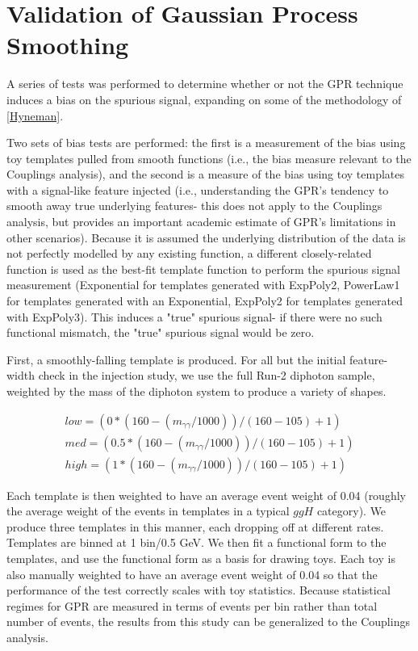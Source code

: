\section{Validation of Gaussian Process Smoothing}
\label{sec:GPR_validation}
A series of tests was performed to determine whether or not the GPR technique induces a bias on the spurious signal, expanding on some of the methodology of \ref{Hyneman}.

Two sets of bias tests are performed: the first is a measurement of the bias using toy templates pulled from smooth functions (i.e., the bias measure relevant to the Couplings analysis), and the second is a measure of the bias using toy templates with a signal-like feature injected (i.e., understanding the GPR's tendency to smooth away true underlying features- this does not apply to the Couplings analysis, but provides an important academic estimate of GPR's limitations in other scenarios). Because it is assumed the underlying distribution of the data is not perfectly modelled by any existing function, a different closely-related function is used as the best-fit template function to perform the spurious signal measurement (Exponential for templates generated with ExpPoly2, PowerLaw1 for templates generated with an Exponential, ExpPoly2 for templates generated with ExpPoly3). This induces a "true" spurious signal- if there were no such functional mismatch, the "true" spurious signal would be zero.

First, a smoothly-falling template is produced. For all but the initial feature-width check in the injection study, we use the full Run-2 \SHERPA diphoton sample, weighted by the mass of the diphoton system to produce a variety of shapes.

\begin{equation}
\begin{split}
low = (0*(160-(m_{\gamma\gamma}/1000))/(160-105)+1) \\
med = (0.5*(160-(m_{\gamma\gamma}/1000))/(160-105)+1) \\
high= (1*(160-(m_{\gamma\gamma}/1000))/(160-105)+1)
\end{split}
\end{equation}

Each template is then weighted to have an average event weight of 0.04 (roughly the average weight of the events in templates in a typical $ggH$ category). We produce three templates in this manner, each dropping off at different rates. Templates are binned at 1 bin/0.5 GeV. We then fit a functional form to the templates, and use the functional form as a basis for drawing toys.  Each toy is also manually weighted to have an average event weight of 0.04 so that the performance of the test correctly scales with toy statistics. Because statistical regimes for GPR are measured in terms of events per bin rather than total number of events, the results from this study can be generalized to the Couplings analysis. 

